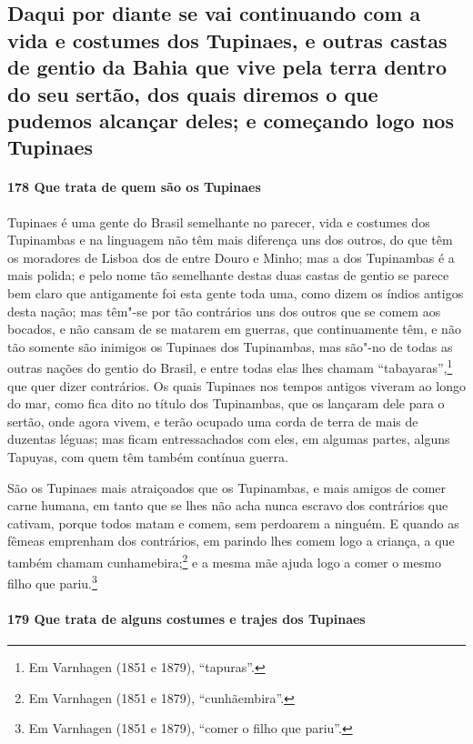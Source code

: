 \subsection{Daqui por diante se vai continuando com a vida e costumes dos Tupinaes, e
outras castas de gentio da Bahia que vive pela terra dentro do seu sertão, dos quais
diremos o que pudemos alcançar deles; e começando logo nos Tupinaes}

\paragraph{178 Que trata de quem são os Tupinaes}

Tupinaes é uma gente do Brasil semelhante no parecer, vida e costumes dos Tupinambas e na
linguagem não têm mais diferença uns dos outros, do que têm os moradores de Lisboa dos
de entre Douro e Minho; mas a dos Tupinambas é a mais polida; e pelo nome tão semelhante
destas duas castas de gentio se parece bem claro que antigamente foi esta gente toda uma,
como dizem os índios antigos desta nação; mas têm"-se por tão contrários uns dos outros que
se comem aos bocados, e não cansam de se matarem em guerras, que continuamente têm, e não
tão somente são inimigos os Tupinaes dos Tupinambas, mas são"-no de todas as outras nações
do gentio do Brasil, e entre todas elas lhes chamam ``tabayaras'',\footnote{ Em Varnhagen
(1851 e 1879), ``tapuras''.} que quer dizer contrários. Os quais Tupinaes nos tempos
antigos viveram ao longo do mar, como fica dito no título dos Tupinambas, que os lançaram
dele para o sertão, onde agora vivem, e terão ocupado uma corda de terra de mais de
duzentas léguas; mas ficam entressachados com eles, em algumas partes, alguns Tapuyas, com
quem têm também contínua guerra.

São os Tupinaes mais atraiçoados que os Tupinambas, e mais amigos de comer carne humana,
em tanto que se lhes não acha nunca escravo dos contrários que cativam, porque todos matam
e comem, sem perdoarem a ninguém. E quando as fêmeas emprenham dos contrários, em parindo
lhes comem logo a criança, a que também chamam cunhamebira;\footnote{ Em Varnhagen (1851 e
1879), ``cunhãembira''.} e a mesma mãe ajuda logo a comer o mesmo filho que
pariu.\footnote{ Em Varnhagen (1851 e 1879), ``comer o filho que pariu''.}

\paragraph{179 Que trata de alguns costumes e trajes dos Tupinaes}

